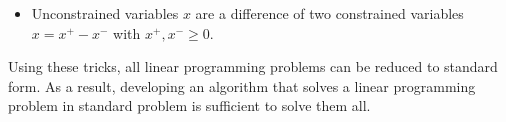 \begin{remark}
\begin{itemize}
        \item Unconstrained variables $ x $ are a difference of two constrained variables $ x = x^+ - x^- $ with $ x^+, x^- \geqslant 0 $.
    \end{itemize}

    Using these tricks, all linear programming problems can be reduced to standard form. As a result, developing an algorithm that solves a linear programming problem in standard problem is sufficient to solve them all.
\end{remark}